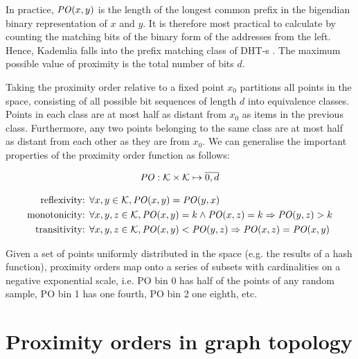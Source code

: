In practice, $\mathit{PO}(x,y)$ is the length of the longest common prefix in the bigendian binary representation of $x$ and $y$. It is therefore most practical to calculate by counting the matching bits of the binary form of the addresses from the left. Hence, Kademlia falls into the prefix matching class of DHT-s \cite{rowstron2001pastry,zhao2004tapestry}. The maximum possible value of proximity is the total number of bits $d$. 

Taking the proximity order relative to a fixed point $x_0$ partitions all points in
the space, consisting of all possible bit sequences of length $d$ into equivalence classes. Points in each class are at
most half as distant from $x_0$ as items in the previous class. Furthermore, any two points belonging to the same class are at most half as distant from each other as they are from $x_0$. 
We can generalise the important properties of the proximity order function as follows:

\begin{definition}\label{def:PO}
\begin{equation}
\mathit{PO}: \mathcal{K}\times \mathcal{K}\mapsto \overline{0,d}
\end{equation}

\begin{subequations}
  \begin{align}
    \label{eq:PO-constraint-symmetry} \text{reflexivity:  }&\forall x,y\in \mathcal{K}, \mathit{PO}(x,y)=\mathit{PO}(y,x)\\
    \label{eq:PO-constraint-monotonicity}\text{monotonicity:   }&\forall x,y,z\in \mathcal{K}, \mathit{PO}(x,y)=k \land  \mathit{PO}(x,z)=k \Rightarrow  \mathit{PO}(y,z)>k\\
\label{eq:PO-constraint-transitivity}\text{transitivity:   }&\forall x,y,z\in \mathcal{K}, \mathit{PO}(x,y)<\mathit{PO}(y,z) \Rightarrow \mathit{PO}(x,z)=\mathit{PO}(x,y)
   \end{align}
\end{subequations}
\end{definition}

Given a set of points uniformly distributed in the space (e.g. the results of a hash function), proximity orders map onto a series of subsets with cardinalities on a negative exponential scale, i.e. PO bin $0$ has half of the points of any random sample, PO bin 1 has one fourth, PO bin 2 one eighth, etc.

\section{Proximity orders in graph topology \statusgreen}

